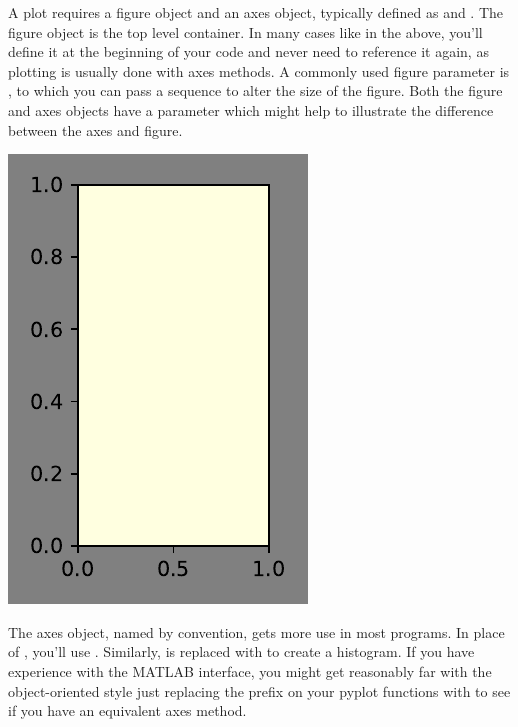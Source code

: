 A plot requires a figure object and an axes object, typically defined as  and . The figure object is the top level container. In many cases like in the above, you'll define it at the beginning of your code and never need to reference it again, as plotting is usually done with axes methods. A commonly used figure parameter is , to which you can pass a sequence to alter the size of the figure. Both the figure and axes objects have a  parameter which might help to illustrate the difference between the axes and figure. 



\begin{center}
    \includegraphics[width = .45\textwidth]{figures/proseplots/figparams.pdf}
\end{center}


The axes object, named  by convention, gets more use in most programs. In place of , you'll use . Similarly,  is replaced with  to create a histogram. If you have experience with the MATLAB interface, you might get reasonably far with the object-oriented style just replacing the  prefix on your pyplot functions with  to see if you have an equivalent axes method.

